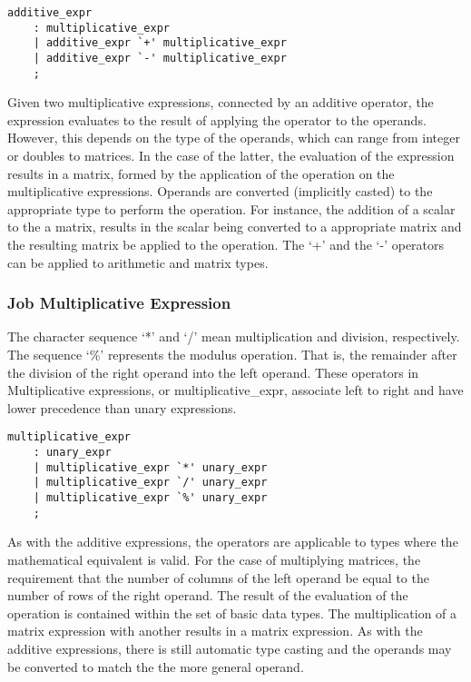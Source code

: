 \documentclass[prodmode,acmtecs]{acmsmall}
\begin{document}
\begin{lstlisting}
additive_expr
	: multiplicative_expr
	| additive_expr `+' multiplicative_expr
	| additive_expr `-' multiplicative_expr
	;
\end{lstlisting}

Given two multiplicative expressions, connected by an additive operator, 
the expression evaluates to the result of applying the operator to the
operands. However, this depends on the type of the operands, which can
range from integer or doubles to matrices. In the case of the latter,
the evaluation of the expression results in a matrix, formed by the 
application of the operation on the multiplicative expressions. Operands 
are converted (implicitly casted) to the appropriate type to perform the
operation. For instance, the addition of a scalar to the a matrix, results in 
the scalar being converted to a appropriate matrix and the resulting matrix
be applied to the operation. The `+' and the `-' operators can be applied 
to arithmetic and matrix types.

\subsubsection{Job Multiplicative Expression}

The character sequence `*' and `/' mean multiplication and division, 
respectively. The sequence `\%' represents the modulus operation. That
is, the remainder after the division of the right operand into the left
operand. These operators in Multiplicative expressions, or 
multiplicative\_expr, associate left to right and have lower precedence 
than unary expressions.

\begin{lstlisting}
multiplicative_expr
	: unary_expr
	| multiplicative_expr `*' unary_expr
	| multiplicative_expr `/' unary_expr
	| multiplicative_expr `%' unary_expr
	;
\end{lstlisting}

As with the additive expressions, the operators are applicable to types
where the mathematical equivalent is valid. For the case of multiplying
matrices, the requirement that the number of columns of the left operand 
be equal to the number of rows of the right operand. The result of the
evaluation of the operation is contained within the set of basic data 
types. The multiplication of a matrix expression with another results in 
a matrix expression. As with the additive expressions, there is still 
automatic type casting and the operands may be converted to match the
the more general operand. 
\end{document}
